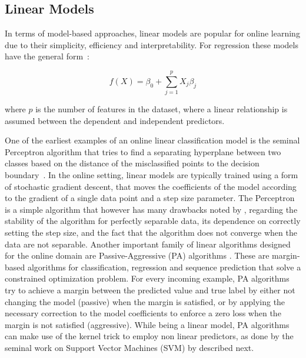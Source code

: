\subsection*{Linear Models}
In terms of model-based approaches, linear models are popular
for online learning due to their simplicity, efficiency and interpretability.
For regression these models have the general form~\cite{esl}:

\begin{equation}
	f(X) = \beta_0 + \sum_{j=1}^{p}{X_j\beta_j}
\end{equation}

\noindent
where $p$ is the number of features in the dataset, where a linear relationship is assumed between the dependent and independent predictors.

One of the earliest examples of an online linear classification model is the seminal
Perceptron algorithm \cite{perceptron} that tries to find a separating hyperplane
between two classes based on the distance of the misclassified points to the
decision boundary~\cite{esl}.
In the online setting, linear models are typically trained using a form
of stochastic gradient descent, that moves the coefficients
of the model according to the gradient of a single data point
and a step size parameter.
The Perceptron is a simple algorithm that however has many drawbacks
noted by \citet{esl}, regarding the stability of the algorithm
for perfectly separable data, its dependence on correctly setting
the step size, and the fact that the algorithm does not
converge when the data are not separable.
Another important family of linear algorithms designed for the online domain
are Passive-Aggressive (PA) algorithms \cite{passive-aggressive}.
These are margin-based algorithms for classification, regression and
sequence prediction that solve a constrained optimization problem.
For every incoming example, PA algorithms
try to achieve a margin between the predicted value and true label
by either not changing the model (passive) when the margin is satisfied,
or by applying the necessary correction to the model coefficients
to enforce a zero loss when the margin is not satisfied (aggressive).
While being a linear model, PA algorithms can make use of the kernel trick to
employ non linear predictors, as done by the seminal work
on Support Vector Machines (SVM) by \citet{svm-book} described next.

